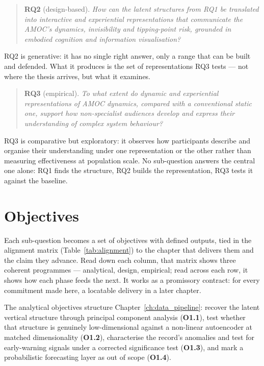 \begin{quote}
\textbf{RQ2} (design-based). \emph{How can the latent structures from RQ1 be translated into interactive and experiential representations that communicate the AMOC's dynamics, invisibility and tipping-point risk, grounded in embodied cognition and information visualisation?}
\end{quote}

RQ2 is generative: it has no single right answer, only a range that can be built and defended. What it produces is the set of representations RQ3 tests --- not where the thesis arrives, but what it examines.

\begin{quote}
\textbf{RQ3} (empirical). \emph{To what extent do dynamic and experiential representations of AMOC dynamics, compared with a conventional static one, support how non-specialist audiences develop and express their understanding of complex system behaviour?}
\end{quote}

RQ3 is comparative but exploratory: it observes how participants describe and organise their understanding under one representation or the other rather than measuring effectiveness at population scale. No sub-question answers the central one alone: RQ1 finds the structure, RQ2 builds the representation, RQ3 tests it against the baseline.

\section{Objectives}
\label{sec:objectives}

Each sub-question becomes a set of objectives with defined outputs, tied in the alignment matrix (Table~\ref{tab:alignment}) to the chapter that delivers them and the claim they advance. Read down each column, that matrix shows three coherent programmes --- analytical, design, empirical; read across each row, it shows how each phase feeds the next. It works as a promissory contract: for every commitment made here, a locatable delivery in a later chapter.

The analytical objectives structure Chapter~\ref{ch:data_pipeline}: recover the latent vertical structure through principal component analysis (\textbf{O1.1}), test whether that structure is genuinely low-dimensional against a non-linear autoencoder at matched dimensionality (\textbf{O1.2}), characterise the record's anomalies and test for early-warning signals under a corrected significance test (\textbf{O1.3}), and mark a probabilistic forecasting layer as out of scope (\textbf{O1.4}).

